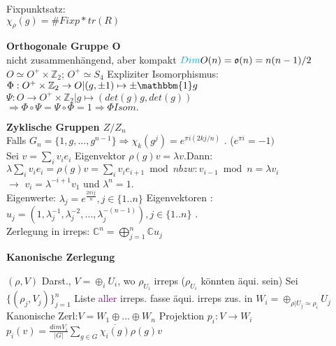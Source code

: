 \documentclass[8pt, a4paper, landscape]{extarticle}
\newcommand{\tit}[1]{\textbf{#1} \\}
\newcommand{\sh}[1]{\small\textbf{#1}}
\newcommand{\hi}[1]{\textcolor{Cerulean}{#1}}
\newcommand{\pu}[1]{\textcolor{purple}{#1}}
\newcommand{\eck}[1]{\mathfrak{#1}}
\begin{document}
\begin{multicols*}{5}
\begin{ibox}
\begin{minipage}{0.45\linewidth}
    \end{minipage}
    \hi{Fixpunktsatz:}\\
    $\chi_\rho(g)=\#Fixp * tr(R)$
    
\end{ibox}
\begin{ibox}
    \tit{Orthogonale Gruppe O}
    \textbullet nicht zusammenhängend, aber kompakt
    \textbullet $\hi{Dim} O(n)=\eck{o}(n)=n(n-1)/2$\\
    \textbullet $O\simeq O^+ \times \mathbb{Z}_2$; $O^+ \simeq S_4$
    Expliziter Isomorphismus:\\
    $\Phi: O^+\times \mathbb{Z}_2 \rightarrow O| (g,\pm 1) \mapsto \pm \mathbbm{1}g$\\
    $\Psi: O\rightarrow O^+\times\mathbb{Z}_2| g\mapsto (det(g)g,det(g))$\\
    $\Rightarrow \Phi\circ\Psi=\Psi\circ\Phi=1\Rightarrow \Phi Isom.$
\end{ibox}
\begin{ibox}
\tit{Zyklische Gruppen $Z/Z_n$}
Falls $G_n = \{1,g,...,g^{n-1}\}$$\Rightarrow \chi_k(g^j) = e^{\pi i (2kj/n) }$ . ($e^{\pi i}=-1)$ \\
Sei $v=\sum_i v_i e_i$  Eigenvektor $\rho(g)v = \lambda v $.Dann:
$\lambda \sum_i v_i e_i=\rho(g) v=\sum_i v_i e_{i+1} \bmod n
bzw:v_{i-1} \bmod n=\lambda v_i$\\
$\rightarrow$ $v_i=\lambda^{-i+1} v_1$ und $\lambda^n=1$.\\
Eigenwerte: $\lambda_j=e^{\frac{2 \pi i j}{n}}, j \in\{1 . . n\}$
Eigenvektoren : $u_j=\left(1, \lambda_j^{-1}, \lambda_j^{-2}, \ldots, \lambda_j^{-(n-1)}\right), j \in\{1 . . n\}$ .\\
Zerlegung in irreps: $\mathbb{C}^n=\bigoplus_{j=1}^n \mathbb{C} u_j$
\end{ibox}

   
   


\begin{cbox}
    \sh{Kanonische Zerlegung}
\end{cbox}
\begin{ibox}
    $(\rho,V)$ Darst., $V=\oplus_iU_i$, wo $\rho_{U_i}$ irreps ($\rho_{U_i}$ könnten äqui. sein)
    Sei $\{(\rho_j,V_j)\}_{j=1}^n$ Liste \pu{aller} irreps. fasse äqui. irreps zus. in $W_i=\oplus_{\rho|U_j\simeq\rho_i}U_j$\\
    \hi{Kanonische Zerl:}$V=W_1\oplus...\oplus W_n$
    \hi{Projektion} $p_i:V\rightarrow W_i$
    $p_i(v)=\frac{dimV_i}{|G|}\sum_{g\in G}\overline{\chi_i(g)}\rho(g)v$
\end{ibox}






\end{multicols*}
\end{document}
